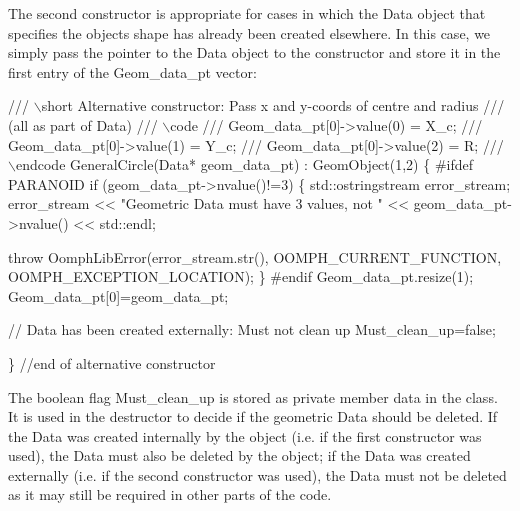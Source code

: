 The second constructor is appropriate for cases in which the {\ttfamily Data} object that specifies the object\textquotesingle{}s shape has already been created elsewhere. In this case, we simply pass the pointer to the Data object to the constructor and store it in the first entry of the {\ttfamily Geom\+\_\+data\+\_\+pt} vector\+:  
\begin{DoxyCodeInclude}
 \textcolor{comment}{/// \(\backslash\)short Alternative constructor:  Pass x and y-coords of centre and radius}
\textcolor{comment}{ /// (all as part of Data)}
\textcolor{comment}{}\textcolor{comment}{ /// \(\backslash\)code }
\textcolor{comment}{}\textcolor{comment}{ /// Geom\_data\_pt[0]->value(0) = X\_c;}
\textcolor{comment}{}\textcolor{comment}{ /// Geom\_data\_pt[0]->value(1) = Y\_c;}
\textcolor{comment}{}\textcolor{comment}{ /// Geom\_data\_pt[0]->value(2) = R;}
\textcolor{comment}{}\textcolor{comment}{ /// \(\backslash\)endcode}
\textcolor{comment}{} GeneralCircle(Data* geom\_data\_pt) : GeomObject(1,2)
  \{
\textcolor{preprocessor}{#ifdef PARANOID}
   \textcolor{keywordflow}{if} (geom\_data\_pt->nvalue()!=3)
    \{
     std::ostringstream error\_stream;
     error\_stream << \textcolor{stringliteral}{"Geometric Data must have 3 values, not "}
                  << geom\_data\_pt->nvalue() << std::endl;

     \textcolor{keywordflow}{throw} OomphLibError(error\_stream.str(),
                         OOMPH\_CURRENT\_FUNCTION,
                         OOMPH\_EXCEPTION\_LOCATION);
    \}
\textcolor{preprocessor}{#endif}
   Geom\_data\_pt.resize(1);
   Geom\_data\_pt[0]=geom\_data\_pt;

   \textcolor{comment}{// Data has been created externally: Must not clean up}
   Must\_clean\_up=\textcolor{keyword}{false};

  \} \textcolor{comment}{//end of alternative constructor}

\end{DoxyCodeInclude}


The boolean flag {\ttfamily Must\+\_\+clean\+\_\+up} is stored as private member data in the class. It is used in the destructor to decide if the geometric {\ttfamily Data} should be deleted. If the {\ttfamily Data} was created internally by the object (i.\+e. if the first constructor was used), the {\ttfamily Data} must also be deleted by the object; if the {\ttfamily Data} was created externally (i.\+e. if the second constructor was used), the {\ttfamily Data} must not be deleted as it may still be required in other parts of the code.


